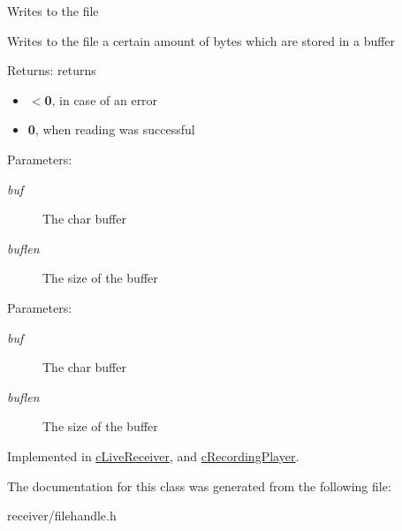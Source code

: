 Writes to the file

Writes to the file a certain amount of bytes which are stored in a buffer

\begin{Desc}
\item[Returns:]returns\begin{itemize}
\item {\bf $<$0}, in case of an error\item {\bf 0}, when reading was successful\end{itemize}
\end{Desc}
\begin{Desc}
\item[Parameters:]
\begin{description}
\item[{\em buf}]The char buffer \item[{\em buflen}]The size of the buffer \end{description}
\end{Desc}
\begin{Desc}
\item[Parameters:]
\begin{description}
\item[{\em buf}]The char buffer \item[{\em buflen}]The size of the buffer \end{description}
\end{Desc}


Implemented in \hyperlink{classcLiveReceiver_eb56988441b589b6e34ea01825dfb183}{cLiveReceiver}, and \hyperlink{classcRecordingPlayer_7dd0cb78ae8032eb677f01d71187d6e0}{cRecordingPlayer}.

The documentation for this class was generated from the following file:\begin{CompactItemize}
\item 
receiver/filehandle.h\end{CompactItemize}
